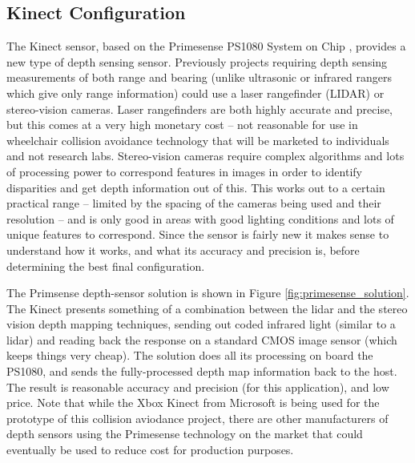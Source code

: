 \documentclass[oneside,final,a4paper]{report}
\begin{document}
\subsection{Kinect Configuration}
The Kinect sensor, based on the Primesense PS1080 System on Chip \cite{primesense}, provides a new type of depth sensing sensor. Previously projects requiring depth sensing measurements of both range and bearing (unlike ultrasonic or infrared rangers which give only range information) could use a laser rangefinder (LIDAR) or stereo-vision cameras. Laser rangefinders are both highly accurate and precise, but this comes at a very high monetary cost -- not reasonable for use in wheelchair collision avoidance technology that will be marketed to individuals and not research labs. Stereo-vision cameras require complex algorithms and lots of processing power to correspond features in images in order to identify disparities and get depth information out of this. This works out to a certain practical range -- limited by the spacing of the cameras being used and their resolution -- and is only good in areas with good lighting conditions and lots of unique features to correspond. Since the sensor is fairly new it makes sense to understand how it works, and what its accuracy and precision is, before determining the best final configuration.

The Primsense depth-sensor solution is shown in Figure \ref{fig:primesense_solution}. The Kinect presents something of a combination between the lidar and the stereo vision depth mapping techniques, sending out coded infrared light (similar to a lidar) and reading back the response on a standard CMOS image sensor (which keeps things very cheap). The solution does all its processing on board the PS1080, and sends the fully-processed depth map information back to the host. The result is reasonable accuracy and precision (for this application), and low price. Note that while the Xbox Kinect from Microsoft is being used for the prototype of this collision aviodance project, there are other manufacturers of depth sensors using the Primesense technology on the market that could eventually be used to reduce cost for production purposes.
\end{document}
